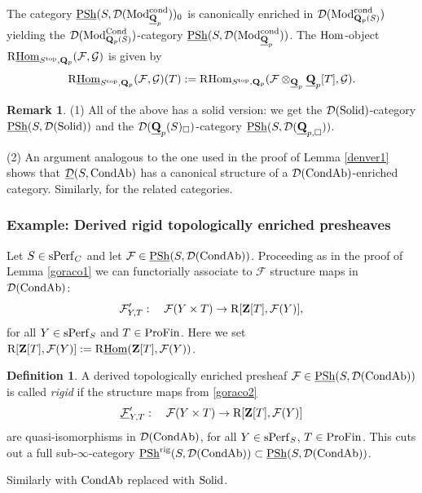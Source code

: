 \documentclass[10pt]{amsart}
\theoremstyle{definition}
\newtheorem{definition}[equation]{Definition}
\newtheorem{remark}[equation]{Remark}
\theoremstyle{remark}
\newcommand{\Hom}{{\rm{Hom}} }
\newcommand{\uHom}{\underline{{\rm{Hom}} }}
\newcommand{\sff}{{\mathcal{F}}}
\newcommand{\sg}{{\mathcal{G}}}
\newcommand{\sd}{{\mathcal{D}}}
\numberwithin{equation}{section}
\def\R{{\mathrm R}}
\def\Q{{\bf Q}} \def\Z{{\bf Z}}
\numberwithin{equation}{section}
\begin{document}
 The category $\underline{\rm PSh}(S,\sd({\rm Mod}^{\rm cond}_{\underline{\Q}_p}))_0$  is canonically enriched in $\sd({\rm Mod}^{\rm cond}_{\Q_p(S)})$ yielding the $\sd({\rm Mod}^{\rm Cond}_{\Q_p(S)})$-category 
 $\underline{\rm PSh}(S,\sd({\rm Mod}^{\rm cond}_{\underline{\Q}_p}))$.  The $\Hom$-object $\R\uHom_{S^{\rm top},\Q_p}(\sff,\sg)$ is given by  $$\R\uHom_{S^{\rm top},\Q_p}(\sff,\sg)(T):=\R\Hom_{S^{\rm top},\Q_p}(\sff\otimes_{\underline{\Q}_p}\underline{\Q}_p[T],\sg).
 $$ 
  \begin{remark}
(1) All of the above has a solid version: we get the $\sd({\rm Solid})$-category $\underline{\rm PSh}(S,\sd({\rm Solid}))$ and the $\sd(\underline{\Q}_{p}(S)_{\Box})$-category $\underline{\rm PSh}(S,\sd(\underline{\Q}_{p,{\Box}}))$.

 (2) An argument analogous to the one used in the proof of Lemma \ref{denver1} shows that $\underline{\sd}(S,{\rm CondAb})$ has a canonical structure of a $\sd({\rm CondAb})$-enriched category. Similarly, for the related categories.
\end{remark}
\subsubsection{Example: Derived rigid topologically enriched  presheaves}  Let $S\in {\rm sPerf}_C$ and let $\sff\in \underline{{\rm PSh}}(S,{\sd}({\rm CondAb}))$. Proceeding as in the proof of Lemma \ref{goraco1} we can functorially associate to $\sff$ 
structure maps in ${\sd}({\rm CondAb})$:
\begin{equation}\label{goraco2}
\sff^{\prime}_{Y,T}:\quad \sff(Y\times T)\to \R[\Z[T],\sff(Y)],
\end{equation}
for all $Y\in {\rm sPerf}_S$ and $T\in {\rm ProFin}$. Here we set $\R[\Z[T],\sff(Y)]:=\R\uHom(\Z[T],\sff(Y))$. 
\begin{definition}
A derived topologically enriched presheaf $\sff\in  \underline{{\rm PSh}}(S,{\sd}({\rm CondAb}))$ is called {\em rigid} if  the structure maps from \eqref{goraco2} 
$$
\underline{\sff}^{\prime}_{Y,T}:\quad  \sff(Y\times T)\to  \R[\Z[T], \sff(Y)]
$$
are quasi-isomorphisms in ${\sd}({\rm CondAb})$, for all $Y\in {\rm sPerf}_S$, $ T\in {\rm ProFin}$. This cuts out a full sub-$\infty$-category $\underline{{\rm PSh}}^{\rm rig}(S,{\sd}({\rm CondAb}))\subset \underline{{\rm PSh}}(S,{\sd}({\rm CondAb}))$.

   Similarly  with  ${\rm CondAb}$ replaced with ${\rm Solid}$.
\end{definition}
\end{document}
